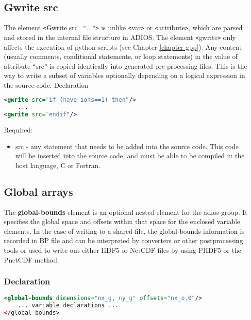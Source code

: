 \subsection{Gwrite src}

The element \texttt{<}Gwrite src=\texttt{"}...\texttt{"}\texttt{>} is unlike \texttt{<}var\texttt{>} 
or \texttt{<}attribute\texttt{>}, which are parsed and stored in the internal file 
structure in ADIOS. The element \texttt{<}gwrite\texttt{>} only affects the execution 
of python scripts (see Chapter \ref{chapter-gpp}). 
Any content (usually comments, conditional statements, 
or loop statements) in the value of attribute ``src'' is copied identically into 
generated pre-processing files. This is the way to write a subset of variables optionally
depending on a logical expression in the source-code. Declaration
\begin{lstlisting}[language=XML]
<gwrite src="if (have_ions==1) then"/>
    ...
<gwrite src="endif"/>
\end{lstlisting}

Required:
\begin{itemize}
\item src -  any statement that needs to be added into the source code. This code will 
be inserted into the source code, and must be able to be compiled in the host language, 
C or Fortran. 
\end{itemize}

\subsection{Global arrays}
\label{section-xml-global-arrays}
The \textbf{global-bounds} element is an optional nested element for the adios-group. 
It specifies the global space and offsets within that space for the enclosed variable 
elements. In the case of writing to a shared file, the global-bounds information 
is recorded in BP file and can be interpreted by converters or other postprocessing 
tools or used to write out either HDF5 or NetCDF files by using PHDF5 or the PnetCDF 
method.

\subsubsection{Declaration}
\begin{lstlisting}[language=XML]
<global-bounds dimensions="nx_g, ny_g" offsets="nx_o,0"/>
    ... variable declarations ... 
</global-bounds>
\end{lstlisting}

